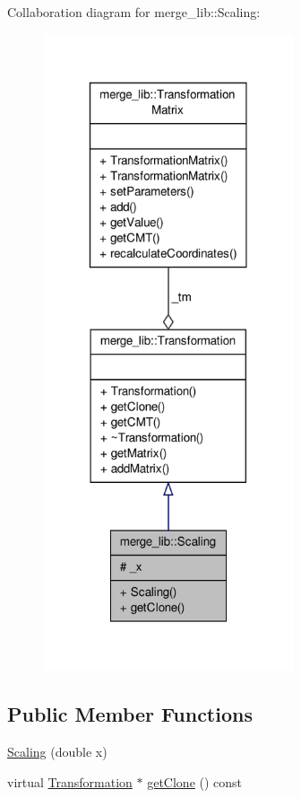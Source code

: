 Collaboration diagram for merge\-\_\-lib\-:\-:Scaling\-:
\nopagebreak
\begin{figure}[H]
\begin{center}
\leavevmode
\includegraphics[width=210pt]{d1/d5d/classmerge__lib_1_1_scaling__coll__graph}
\end{center}
\end{figure}
\subsection*{Public Member Functions}
\begin{DoxyCompactItemize}
\item 
\hyperlink{classmerge__lib_1_1_scaling_ae86e47901770e3e37db2c1b3a4484fd8}{Scaling} (double x)
\item 
virtual \hyperlink{classmerge__lib_1_1_transformation}{Transformation} $\ast$ \hyperlink{classmerge__lib_1_1_scaling_a0f782434054cd02e9d7fb35deca63f53}{get\-Clone} () const 
\end{DoxyCompactItemize}
